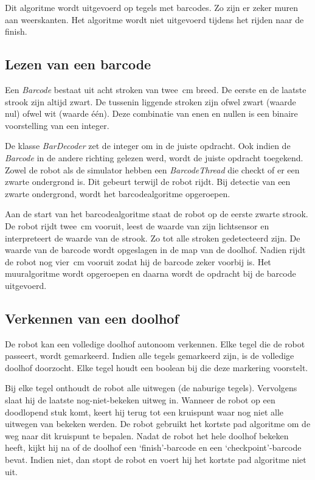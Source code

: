 \documentclass[eind]{penoverslag}
\begin{document}
Dit algoritme wordt uitgevoerd op tegels met barcodes. Zo zijn er zeker muren aan weerskanten. Het algoritme wordt niet uitgevoerd tijdens het rijden naar de finish.

\subsection{Lezen van een barcode} %
\label{ssec:algoBarcode}
Een \textit{Barcode} bestaat uit acht stroken van twee~cm breed. De eerste en de laatste strook zijn altijd zwart. De tussenin liggende stroken zijn ofwel zwart (waarde nul) ofwel wit (waarde \'e\'en). Deze combinatie van enen en nullen is een binaire voorstelling van een integer.

De klasse \textit{BarDecoder} zet de integer om in de juiste opdracht. Ook indien de \textit{Barcode} in de andere richting gelezen werd, wordt de juiste opdracht toegekend.\\

Zowel de robot als de simulator hebben een \textit{BarcodeThread} die checkt of er een zwarte ondergrond is. Dit gebeurt terwijl de robot rijdt. Bij detectie van een zwarte ondergrond, wordt het barcodealgoritme opgeroepen.

Aan de start van het barcodealgoritme staat de robot op de eerste zwarte strook. De robot rijdt twee~cm vooruit, leest de waarde van zijn lichtsensor en interpreteert de waarde van de strook. Zo tot alle stroken gedetecteerd zijn. De waarde van de barcode wordt opgeslagen in de map van de doolhof. Nadien rijdt de robot nog vier~cm vooruit zodat hij de barcode zeker voorbij is. Het muuralgoritme wordt opgeroepen en daarna wordt de opdracht bij de barcode uitgevoerd.


\subsection{Verkennen van een doolhof} %
\label{ssec:algoOnderzDoolhof}

De robot kan een volledige doolhof autonoom verkennen. Elke tegel die de robot passeert, wordt gemarkeerd. Indien alle tegels gemarkeerd zijn, is de volledige doolhof doorzocht. Elke tegel houdt een boolean bij die deze markering voorstelt.

Bij elke tegel onthoudt de robot alle uitwegen (de naburige tegels). Vervolgens slaat hij de laatste nog-niet-bekeken uitweg in. Wanneer de robot op een doodlopend stuk komt, keert hij terug tot een kruispunt waar nog niet alle uitwegen van bekeken werden. De robot gebruikt het kortste pad algoritme om de weg naar dit kruispunt te bepalen.
Nadat de robot het hele doolhof bekeken heeft, kijkt hij na of de doolhof een `finish'-barcode en een `checkpoint'-barcode bevat. Indien niet, dan stopt de robot en voert hij het kortste pad algoritme niet uit.\\
\end{document}
